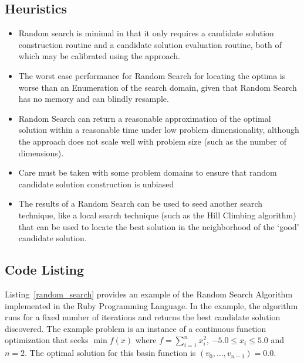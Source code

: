 \subsection{Heuristics}
\begin{itemize}
	\item Random search is minimal in that it only requires a candidate solution construction routine and a candidate solution evaluation routine, both of which may be calibrated using the approach.
	\item The worst case performance for Random Search for locating the optima is worse than an Enumeration of the search domain, given that Random Search has no memory and can blindly resample.
	\item Random Search can return a reasonable approximation of the optimal solution within a reasonable time under low problem dimensionality, although the approach does not scale well with problem size (such as the number of dimensions).
	\item Care must be taken with some problem domains to ensure that random candidate solution construction is  unbiased
	\item The results of a Random Search can be used to seed another search technique, like a local search technique (such as the Hill Climbing algorithm) that can be used to locate the best solution in the neighborhood of the `good' candidate solution.
\end{itemize}

\subsection{Code Listing}
Listing~\ref{random_search} provides an example of the Random Search Algorithm implemented in the Ruby Programming Language. 
In the example, the algorithm runs for a fixed number of iterations and returns the best candidate solution discovered. 
The example problem is an instance of a continuous function optimization that seeks $\min f(x)$ where $f=\sum_{i=1}^n x_{i}^2$, $-5.0\leq x_i \leq 5.0$ and $n=2$. The optimal solution for this basin function is $(v_0,\ldots,v_{n-1})=0.0$.

